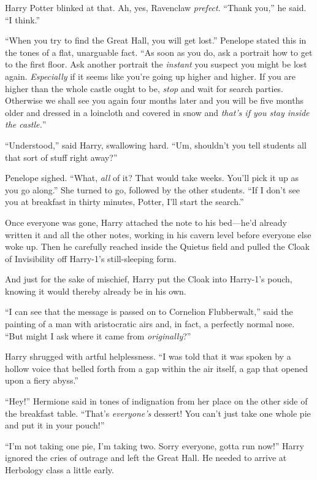 Harry Potter blinked at that. Ah, yes, Ravenclaw \emph{prefect}. “Thank you,” he said. “I think.”

“When you try to find the Great Hall, you will get lost.” Penelope stated this in the tones of a flat, unarguable fact. “As soon as you do, ask a portrait how to get to the first floor. Ask another portrait the \emph{instant} you suspect you might be lost again. \emph{Especially} if it seems like you’re going up higher and higher. If you are higher than the whole castle ought to be, \emph{stop} and wait for search parties. Otherwise we shall see you again four months later and you will be five months older and dressed in a loincloth and covered in snow and \emph{that’s if you stay inside the castle.}”

“Understood,” said Harry, swallowing hard. “Um, shouldn’t you tell students all that sort of stuff right away?”

Penelope sighed. “What, \emph{all} of it? That would take weeks. You’ll pick it up as you go along.” She turned to go, followed by the other students. “If I don’t see you at breakfast in thirty minutes, Potter, I’ll start the search.”

Once everyone was gone, Harry attached the note to his bed—he’d already written it and all the other notes, working in his cavern level before everyone else woke up. Then he carefully reached inside the Quietus field and pulled the Cloak of Invisibility off Harry-1’s still-sleeping form.

And just for the sake of mischief, Harry put the Cloak into Harry-1’s pouch, knowing it would thereby already be in his own.

\later

“I can see that the message is passed on to Cornelion Flubberwalt,” said the painting of a man with aristocratic airs and, in fact, a perfectly normal nose. “But might I ask where it came from \emph{originally}?”

Harry shrugged with artful helplessness. “I was told that it was spoken by a hollow voice that belled forth from a gap within the air itself, a gap that opened upon a fiery abyss.”

\later

“Hey!” Hermione said in tones of indignation from her place on the other side of the breakfast table. “That’s \emph{everyone’s} dessert! You can’t just take one whole pie and put it in your pouch!”

“I’m not taking one pie, I’m taking two. Sorry everyone, gotta run now!” Harry ignored the cries of outrage and left the Great Hall. He needed to arrive at Herbology class a little early.

